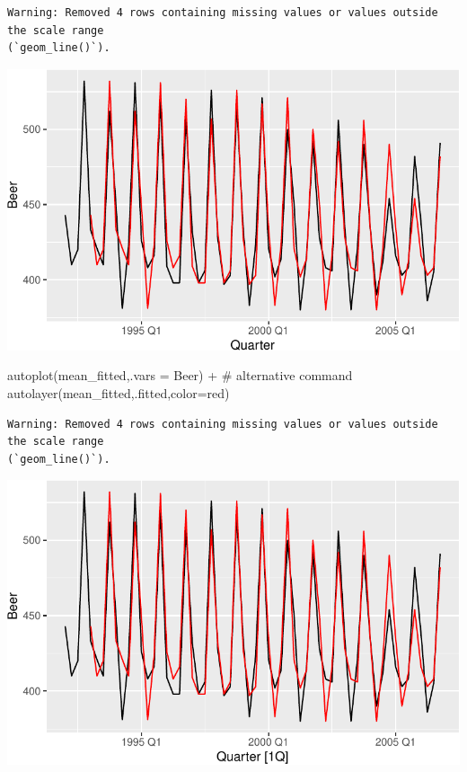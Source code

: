 \documentclass[
  letterpaper,
  DIV=11,
  numbers=noendperiod]{scrartcl}
\newenvironment{Shaded}{\begin{snugshade}}{\end{snugshade}}
\newcommand{\AttributeTok}[1]{\textcolor[rgb]{0.40,0.45,0.13}{#1}}
\newcommand{\CommentTok}[1]{\textcolor[rgb]{0.37,0.37,0.37}{#1}}
\newcommand{\FunctionTok}[1]{\textcolor[rgb]{0.28,0.35,0.67}{#1}}
\newcommand{\NormalTok}[1]{\textcolor[rgb]{0.00,0.23,0.31}{#1}}
\newcommand{\SpecialCharTok}[1]{\textcolor[rgb]{0.37,0.37,0.37}{#1}}
\newcommand{\StringTok}[1]{\textcolor[rgb]{0.13,0.47,0.30}{#1}}
\begin{document}
\begin{verbatim}
Warning: Removed 4 rows containing missing values or values outside the scale range
(`geom_line()`).
\end{verbatim}

\begin{center}
\includegraphics{chapter5_review_files/figure-pdf/unnamed-chunk-27-1.pdf}
\end{center}

\begin{Shaded}
\begin{Highlighting}[]
\FunctionTok{autoplot}\NormalTok{(mean\_fitted,}\AttributeTok{.vars =}\NormalTok{ Beer) }\SpecialCharTok{+} \CommentTok{\# alternative command}
  \FunctionTok{autolayer}\NormalTok{(mean\_fitted,.fitted,}\AttributeTok{color=}\StringTok{\textquotesingle{}red\textquotesingle{}}\NormalTok{)}
\end{Highlighting}
\end{Shaded}

\begin{verbatim}
Warning: Removed 4 rows containing missing values or values outside the scale range
(`geom_line()`).
\end{verbatim}

\begin{center}
\includegraphics{chapter5_review_files/figure-pdf/unnamed-chunk-27-2.pdf}
\end{center}
\end{document}
